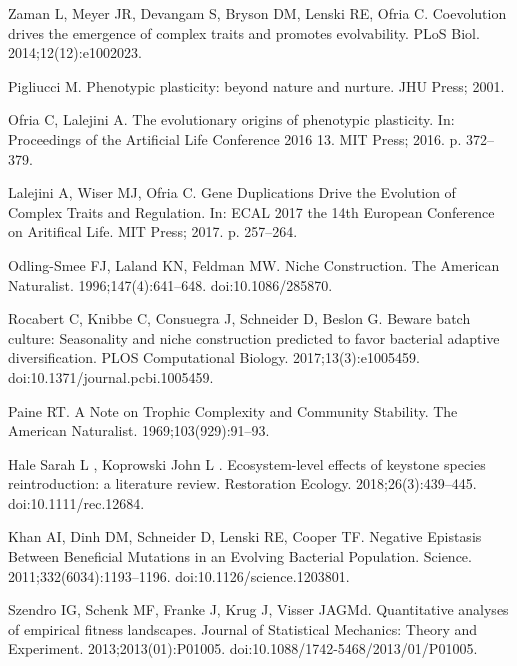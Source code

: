 \documentclass[10pt,letterpaper,final]{article}
\begin{document}
\begin{thebibliography}{10}
Zaman L, Meyer JR, Devangam S, Bryson DM, Lenski RE, Ofria C.
\newblock Coevolution drives the emergence of complex traits and promotes
  evolvability.
\newblock PLoS Biol. 2014;12(12):e1002023.

Pigliucci M.
\newblock Phenotypic plasticity: beyond nature and nurture.
\newblock JHU Press; 2001.

Ofria C, Lalejini A.
\newblock The evolutionary origins of phenotypic plasticity.
\newblock In: Proceedings of the {Artificial} {Life} {Conference} 2016 13. MIT
  Press; 2016. p. 372--379.

Lalejini A, Wiser MJ, Ofria C.
\newblock Gene {Duplications} {Drive} the {Evolution} of {Complex} {Traits} and
  {Regulation}.
\newblock In: {ECAL} 2017 the 14th {European} {Conference} on {Aritifical}
  {Life}. MIT Press; 2017. p. 257--264.

Odling-Smee FJ, Laland KN, Feldman MW.
\newblock Niche {Construction}.
\newblock The American Naturalist. 1996;147(4):641--648.
\newblock doi:{10.1086/285870}.

Rocabert C, Knibbe C, Consuegra J, Schneider D, Beslon G.
\newblock Beware batch culture: {Seasonality} and niche construction predicted
  to favor bacterial adaptive diversification.
\newblock PLOS Computational Biology. 2017;13(3):e1005459.
\newblock doi:{10.1371/journal.pcbi.1005459}.

Paine RT.
\newblock A {Note} on {Trophic} {Complexity} and {Community} {Stability}.
\newblock The American Naturalist. 1969;103(929):91--93.

{Hale Sarah L }, {Koprowski John L }.
\newblock Ecosystem-level effects of keystone species reintroduction: a
  literature review.
\newblock Restoration Ecology. 2018;26(3):439--445.
\newblock doi:{10.1111/rec.12684}.

Khan AI, Dinh DM, Schneider D, Lenski RE, Cooper TF.
\newblock Negative {Epistasis} {Between} {Beneficial} {Mutations} in an
  {Evolving} {Bacterial} {Population}.
\newblock Science. 2011;332(6034):1193--1196.
\newblock doi:{10.1126/science.1203801}.

Szendro IG, Schenk MF, Franke J, Krug J, Visser JAGMd.
\newblock Quantitative analyses of empirical fitness landscapes.
\newblock Journal of Statistical Mechanics: Theory and Experiment.
  2013;2013(01):P01005.
\newblock doi:{10.1088/1742-5468/2013/01/P01005}.


\end{thebibliography}
\end{document}

